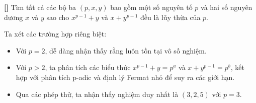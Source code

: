 \documentclass[../05-modular-arithmetic-a.tex]{subfiles}
\begin{document}
\begin{example*}\label{example:IND-2015-TST3-P2}\textbf{[]}
	Tìm tất cả các bộ ba \( (p, x, y) \) bao gồm một số nguyên tố \( p \) và hai số nguyên dương \( x \) và \( y \)
	sao cho \( x^{p-1} + y \) và \( x + y^{p-1} \) đều là lũy thừa của \( p \).
\end{example*}

\begin{story*}
    Ta xét các trường hợp riêng biệt:  
    \begin{itemize}[topsep=0pt, partopsep=0pt, itemsep=0pt]
        \item Với \( p = 2 \), dễ dàng nhận thấy rằng luôn tồn tại vô số nghiệm.
        \item Với \( p > 2 \), ta phân tích các biểu thức \( x^{p-1} + y = p^a \) và \( x + y^{p-1} = p^b \), kết hợp với phân tích p-adic và định lý Fermat nhỏ để suy ra các giới hạn.
        \item Qua các phép thử, ta nhận thấy nghiệm duy nhất là \( (3, 2, 5) \) với \( p = 3 \).
    \end{itemize}
\end{story*}

\bigbreak
\end{document}
